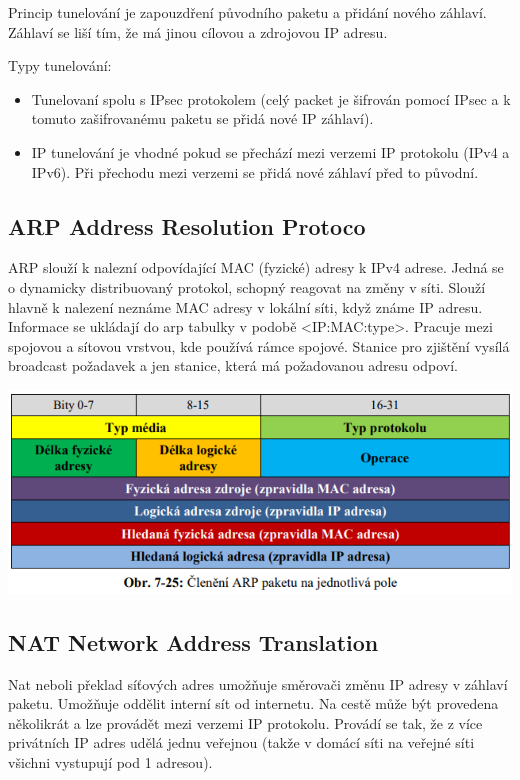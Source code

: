 Princip tunelování je zapouzdření původního paketu a přidání nového záhlaví. Záhlaví se liší tím, že má jinou cílovou a zdrojovou IP adresu.

Typy tunelování:
\begin{itemize}[noitemsep]
    \item Tunelovaní spolu s IPsec protokolem (celý packet je šifrován pomocí IPsec a k tomuto zašifrovanému paketu se přidá nové IP záhlaví).
    \item IP tunelování je vhodné pokud se přechází mezi verzemi IP protokolu (IPv4 a IPv6). Při přechodu mezi verzemi se přidá nové záhlaví před to původní.
\end{itemize}

\subsection{ARP Address Resolution Protoco}

ARP slouží k nalezní odpovídající MAC (fyzické) adresy k IPv4 adrese. Jedná se o dynamicky distribuovaný protokol, schopný reagovat na změny v síti. Slouží hlavně k nalezení neznáme MAC adresy v lokální síti, když známe IP adresu. Informace se ukládají do arp tabulky v podobě <IP:MAC:type>. Pracuje mezi spojovou a sítovou vrstvou, kde používá rámce spojové. Stanice pro zjištění vysílá broadcast požadavek a jen stanice, která má požadovanou adresu odpoví.

\begin{center}
	\includegraphics[scale=0.5]{images/-038.png}
\end{center}
    
\subsection{NAT Network Address Translation}

Nat neboli překlad síťových adres umožňuje směrovači změnu IP adresy v záhlaví paketu. Umožňuje oddělit interní sít od internetu. Na cestě může být provedena několikrát a lze provádět mezi verzemi IP protokolu. Provádí se tak, že z více privátních IP adres udělá jednu veřejnou (takže v domácí síti na veřejné síti všichni vystupují pod 1 adresou).

